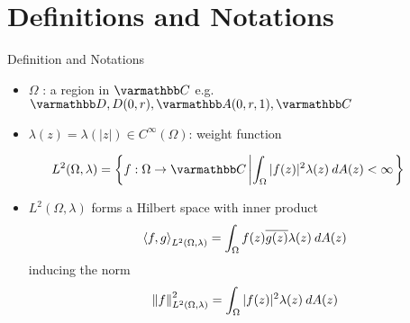 \documentclass{reu_beamer}
\begin{document}
\section{Definitions and Notations}
\begin{frame}{Definition and Notations}
\begin{itemize}
    \item $\Omega $ : a region in \(\C\) e.g. $ \mathbb{D},D(0,r),\mathbb{A}(0,r,1),\C$
    \item $\lambda(z)=\lambda(|z|)\in C^{\infty}(\Omega)$: weight function
\end{itemize} 
\begin{definition}
    \begin{align*}
        L^{2}(\Omega,\lambda) &= \set{f: \Omega \rightarrow \C \left| \int_{\Omega}|f(z)|^2\lambda(z) \: d A(z) < \infty\right.}
    \end{align*}
\end{definition}

\begin{itemize}
    \item \(L^2(\Omega, \lambda)\) forms a Hilbert space with inner product
    \[\left\langle f, g\right\rangle_{L^2(\Omega, \lambda)} = \int_\Omega f(z) \overline{g(z)} \lambda(z)\: dA(z)\]
    inducing the norm
    \[\left\Vert f \right\Vert_{L^{2}(\Omega,\lambda)}^2 = \int_{\Omega}|f(z)|^2\lambda(z)\:dA(z)\]
\end{itemize}
\end{frame}
\end{document}
